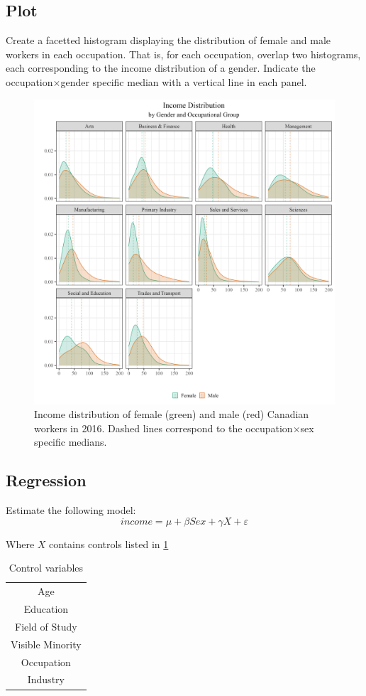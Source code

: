 \documentclass[12pt]{article}
\begin{document}
\subsection{Plot}
Create a facetted histogram displaying the distribution of female and male workers in each occupation. That is, for each occupation, overlap two histograms, each corresponding to the income distribution of a gender. Indicate the occupation$\times$gender specific median with a vertical line in each panel.


\begin{figure}[H]
  \centering
  \includegraphics[scale=0.1]{income_distr}
  \caption{Income distribution of female (green) and male (red) Canadian workers in 2016. Dashed lines correspond to the occupation$\times$sex specific medians.}
\end{figure}



\subsection{Regression}
Estimate the following model: $$income = \mu + \beta Sex + \gamma X + \varepsilon$$

\noindent Where $X$ contains controls listed in \ref{tab:controls}

\begin{table}[H]
\centering
\caption{Control variables}
\label{tab:controls}
\begin{tabular}{@{}c@{}}
 \midrule
Age \\
Education \\
Field of Study \\
Visible Minority \\
Occupation \\
Industry \\
\bottomrule
\end{tabular}
\end{table}
 
\end{document}
